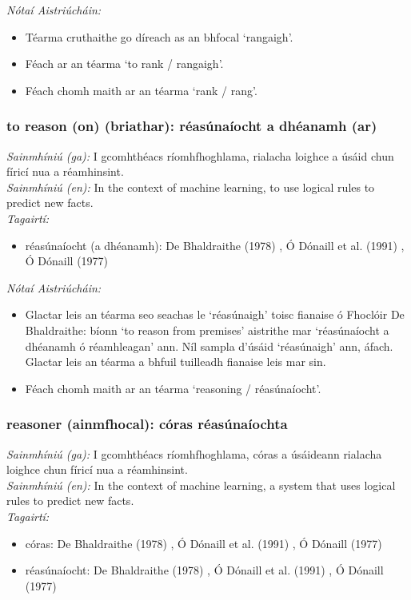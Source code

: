  \noindent \textit{Nótaí Aistriúcháin:}
\begin{itemize}
	\item Téarma cruthaithe go díreach as an bhfocal `rangaigh'.
	\item Féach ar an téarma `to rank / rangaigh'.
	\item Féach chomh maith ar an téarma `rank / rang'.
\end{itemize}


\subsubsection*{to reason (on) (briathar): réasúnaíocht a dhéanamh (ar)}
 \noindent \textit{Sainmhíniú (ga):} I gcomhthéacs ríomhfhoghlama, rialacha loighce a úsáid chun fíricí nua a réamhinsint.
\\
 \noindent \textit{Sainmhíniú (en):} In the context of machine learning, to use logical rules to predict new facts.
\\
 \noindent \textit{Tagairtí:}
\begin{itemize}
	\item réasúnaíocht (a dhéanamh): De Bhaldraithe (1978) \cite{de-bhaldraithe}, Ó Dónaill et al. (1991) \cite{focloir-beag}, Ó Dónaill (1977) \cite{odonaill}
\end{itemize}

 \noindent \textit{Nótaí Aistriúcháin:}
\begin{itemize}
	\item Glactar leis an téarma seo seachas le `réasúnaigh' toisc fianaise ó Fhoclóir De Bhaldraithe: bíonn `to reason from premises' aistrithe mar `réasúnaíocht a dhéanamh ó réamhleagan' ann. Níl sampla d'úsáid `réasúnaigh' ann, áfach. Glactar leis an téarma a bhfuil tuilleadh fianaise leis mar sin.
	\item Féach chomh maith ar an téarma `reasoning / réasúnaíocht'.
\end{itemize}


\subsubsection*{reasoner (ainmfhocal): córas réasúnaíochta}
 \noindent \textit{Sainmhíniú (ga):} I gcomhthéacs ríomhfhoghlama, córas a úsáideann rialacha loighce chun fíricí nua a réamhinsint.
\\
 \noindent \textit{Sainmhíniú (en):} In the context of machine learning, a system that uses logical rules to predict new facts.
\\
 \noindent \textit{Tagairtí:}
\begin{itemize}
	\item córas: De Bhaldraithe (1978) \cite{de-bhaldraithe}, Ó Dónaill et al. (1991) \cite{focloir-beag}, Ó Dónaill (1977) \cite{odonaill}
	\item réasúnaíocht: De Bhaldraithe (1978) \cite{de-bhaldraithe}, Ó Dónaill et al. (1991) \cite{focloir-beag}, Ó Dónaill (1977) \cite{odonaill}
\end{itemize}

